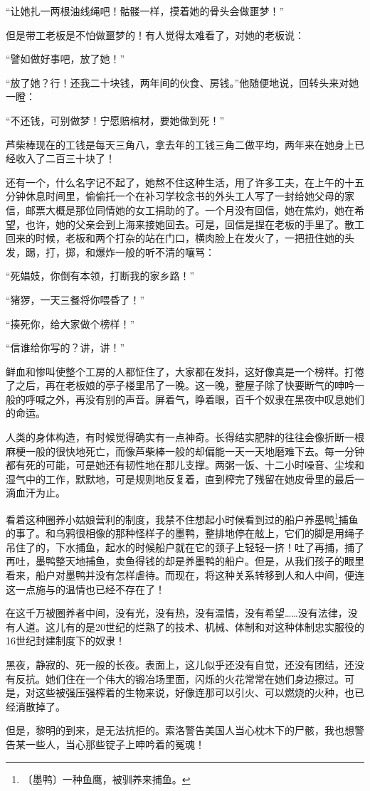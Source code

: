 \documentclass[12pt,UTF-8,openany]{ctexbook}
\begin{document}
\begin{normalsize}
    “让她扎一两根油线绳吧！骷髅一样，摸着她的骨头会做噩梦！”
    
    但是带工老板是不怕做噩梦的！有人觉得太难看了，对她的老板说：
    
    “譬如做好事吧，放了她！”
    
    “放了她？行！还我二十块钱，两年间的伙食、房钱。”他随便地说，回转头来对她一瞪：
    
    “不还钱，可别做梦！宁愿赔棺材，要她做到死！”
    
    芦柴棒现在的工钱是每天三角八，拿去年的工钱三角二做平均，两年来在她身上已经收入了二百三十块了！
    
    还有一个，什么名字记不起了，她熬不住这种生活，用了许多工夫，在上午的十五分钟休息时间里，偷偷托一个在补习学校念书的外头工人写了一封给她父母的家信，邮票大概是那位同情她的女工捐助的了。一个月没有回信，她在焦灼，她在希望，也许，她的父亲会到上海来接她回去。可是，回信是捏在老板的手里了。散工回来的时候，老板和两个打杂的站在门口，横肉脸上在发火了，一把扭住她的头发，踢，打，掷，和爆炸一般的听不清的嚷骂：
    
    “死娼妓，你倒有本领，打断我的家乡路！”
    
    “猪猡，一天三餐将你喂昏了！”
    
    “揍死你，给大家做个榜样！”
    
    “信谁给你写的？讲，讲！”
    
    鲜血和惨叫使整个工房的人都怔住了，大家都在发抖，这好像真是一个榜样。打倦了之后，再在老板娘的亭子楼里吊了一晚。这一晚，整屋子除了快要断气的呻吟一般的呼喊之外，再没有别的声音。屏着气，睁着眼，百千个奴隶在黑夜中叹息她们的命运。
    
    人类的身体构造，有时候觉得确实有一点神奇。长得结实肥胖的往往会像折断一根麻梗一般的很快地死亡，而像芦柴棒一般的却偏能一天一天地磨难下去。每一分钟都有死的可能，可是她还有韧性地在那儿支撑。两粥一饭、十二小时噪音、尘埃和湿气中的工作，默默地，可是规则地反复着，直到榨完了残留在她皮骨里的最后一滴血汗为止。
    
    看着这种圈养小姑娘营利的制度，我禁不住想起小时候看到过的船户养墨鸭\footnote{〔墨鸭〕一种鱼鹰，被驯养来捕鱼。}捕鱼的事了。和乌鸦很相像的那种怪样子的墨鸭，整排地停在舷上，它们的脚是用绳子吊住了的，下水捕鱼，起水的时候船户就在它的颈子上轻轻一挤！吐了再捕，捕了再吐，墨鸭整天地捕鱼，卖鱼得钱的却是养墨鸭的船户。但是，从我们孩子的眼里看来，船户对墨鸭并没有怎样虐待。而现在，将这种关系转移到人和人中间，便连这一点施与的温情也已经不存在了！
    
    在这千万被圈养者中间，没有光，没有热，没有温情，没有希望……没有法律，没有人道。这儿有的是20世纪的烂熟了的技术、机械、体制和对这种体制忠实服役的16世纪封建制度下的奴隶！
    
    黑夜，静寂的、死一般的长夜。表面上，这儿似乎还没有自觉，还没有团结，还没有反抗。她们住在一个伟大的锻冶场里面，闪烁的火花常常在她们身边擦过。可是，对这些被强压强榨着的生物来说，好像连那可以引火、可以燃烧的火种，也已经消散掉了。
    
    但是，黎明的到来，是无法抗拒的。索洛警告美国人当心枕木下的尸骸，我也想警告某一些人，当心那些锭子上呻吟着的冤魂！
    
\end{normalsize}
\end{document}
